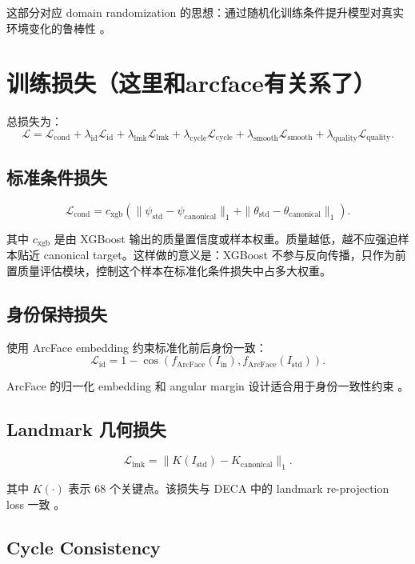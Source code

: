 \documentclass[UTF8,12pt,fontset=fandol]{ctexart}
\begin{document}
这部分对应 domain randomization 的思想：通过随机化训练条件提升模型对真实环境变化的鲁棒性 \cite{domainrandomization2017}。

\section{训练损失（这里和arcface有关系了）}

总损失为：
\[
\mathcal{L} =
\mathcal{L}_{\text{cond}}
+ \lambda_{\text{id}}\mathcal{L}_{\text{id}}
+ \lambda_{\text{lmk}}\mathcal{L}_{\text{lmk}}
+ \lambda_{\text{cycle}}\mathcal{L}_{\text{cycle}}
+ \lambda_{\text{smooth}}\mathcal{L}_{\text{smooth}}
+ \lambda_{\text{quality}}\mathcal{L}_{\text{quality}}.
\]

\subsection{标准条件损失}

\[
\mathcal{L}_{\text{cond}} =
c_{\text{xgb}}\left(
\|\psi_{\text{std}}-\psi_{\text{canonical}}\|_1
+
\|\theta_{\text{std}}-\theta_{\text{canonical}}\|_1
\right).
\]

其中 \(c_{\text{xgb}}\) 是由 XGBoost 输出的质量置信度或样本权重。质量越低，越不应强迫样本贴近 canonical target。这样做的意义是：XGBoost 不参与反向传播，只作为前置质量评估模块，控制这个样本在标准化条件损失中占多大权重。

\subsection{身份保持损失}

使用 ArcFace embedding 约束标准化前后身份一致：
\[
\mathcal{L}_{\text{id}} =
1 -
\cos
\left(
f_{\text{ArcFace}}(I_{\text{in}}),
f_{\text{ArcFace}}(I_{\text{std}})
\right).
\]

ArcFace 的归一化 embedding 和 angular margin 设计适合用于身份一致性约束 \cite{arcface2019}。

\subsection{Landmark 几何损失}

\[
\mathcal{L}_{\text{lmk}} =
\|K(I_{\text{std}})-K_{\text{canonical}}\|_1.
\]

其中 \(K(\cdot)\) 表示 68 个关键点。该损失与 DECA 中的 landmark re-projection loss 一致 \cite{deca2021}。

\subsection{Cycle Consistency}
\end{document}
